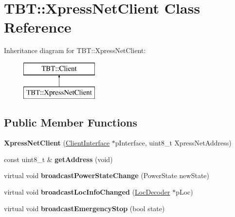 \hypertarget{classTBT_1_1XpressNetClient}{}\section{T\+BT\+:\+:Xpress\+Net\+Client Class Reference}
\label{classTBT_1_1XpressNetClient}
Inheritance diagram for T\+BT\+:\+:Xpress\+Net\+Client\+:\begin{figure}[H]
\begin{center}
\leavevmode
\includegraphics[height=2.000000cm]{classTBT_1_1XpressNetClient}
\end{center}
\end{figure}
\subsection*{Public Member Functions}
\begin{DoxyCompactItemize}
\item 
\mbox{\label{classTBT_1_1XpressNetClient_a7647a4b5b68c29a2ed7d8832b6d1b692}} 
{\bfseries Xpress\+Net\+Client} (\hyperlink{classTBT_1_1ClientInterface}{Client\+Interface} $\ast$p\+Interface, uint8\+\_\+t Xpress\+Net\+Address)
\item 
\mbox{\label{classTBT_1_1XpressNetClient_aae838c0fdb74c9c7220056e3fa011390}} 
const uint8\+\_\+t \& {\bfseries get\+Address} (void)
\item 
\mbox{\label{classTBT_1_1XpressNetClient_aaec3abaf311b9a7b733431831daa4765}} 
virtual void {\bfseries broadcast\+Power\+State\+Change} (Power\+State new\+State)
\item 
\mbox{\label{classTBT_1_1XpressNetClient_a0ef986da287d7fbfea163ae6016a7154}} 
virtual void {\bfseries broadcast\+Loc\+Info\+Changed} (\hyperlink{classTBT_1_1LocDecoder}{Loc\+Decoder} $\ast$p\+Loc)
\item 
\mbox{\label{classTBT_1_1XpressNetClient_a78406757b595f036d5f782f03220978a}} 
virtual void {\bfseries broadcast\+Emergency\+Stop} (bool state)
\end{DoxyCompactItemize}
